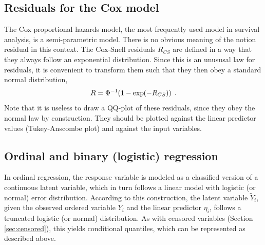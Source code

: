 \documentclass[11pt]{article}\usepackage[]{graphicx}\usepackage[]{color}
\begin{document}
\subsection{Residuals for the Cox model}

The Cox proportional hazards model, the most frequently used model in
survival analysis, is a semi-parametric model. There is no obvious meaning
of the notion residual in this context. 
The Cox-Snell residuals $R_{CS}$ are defined in a way that they always
follow an exponential distribution. 
Since this is an unususal law for residuals, it is convenient to transform
them such that they then obey a standard normal distribution,
\[
  R = \Phi^{-1}\kern-2pt\left(1-\exp\kern-2pt\left(-R_{CS}\right)\right)
\;.\]
Note that it is useless to draw a QQ-plot of these residuals, since they
obey the normal law by construction. 
They should be plotted against the linear predictor values 
(Tukey-Anscombe plot) and against the input variables.



\subsection{Ordinal and binary (logistic) regression}

In ordinal regression, the response variable is modeled as a classified
version of a continuous latent variable, which in turn follows a linear
model with logistic (or normal) error distribution.
According to this construction, the latent variable $\widetilde Y_i$, given the
observed ordered variable $Y_i$ and the linear predictor $\eta_i$, 
follows a truncated logistic (or normal) distribution. 
As with censored variables (Section \ref{sec:censored}), this yields 
conditional quantiles, which can be represented as described above.
\end{document}
